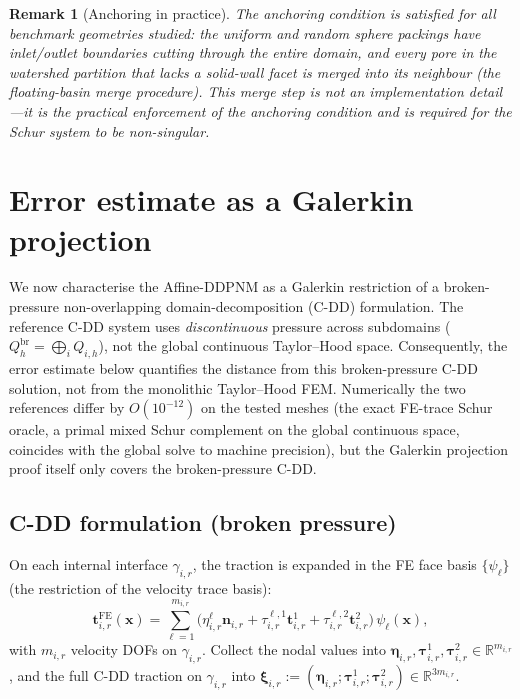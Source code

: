 \documentclass[11pt,a4paper]{article}
\newtheorem{remark}[lemma]{Remark}
\newcommand{\R}{\mathbb{R}}
\newcommand{\iface}{\gamma}
\newcommand{\normal}{\bm{n}}
\begin{document}
\begin{remark}[Anchoring in practice]
  The anchoring condition is satisfied for all benchmark geometries
  studied: the uniform and random sphere packings have inlet/outlet
  boundaries cutting through the entire domain, and every pore in the
  watershed partition that lacks a solid-wall facet is merged into its
  neighbour (the \emph{floating-basin merge} procedure).  This merge
  step is not an implementation detail---it is the practical enforcement
  of the anchoring condition and is required for the Schur system to be
  non-singular.
\end{remark}

\appendix
\section{Error estimate as a Galerkin projection}
\setcounter{lemma}{0}
\setcounter{theorem}{0}

We now characterise the Affine-DDPNM as a Galerkin restriction of a
broken-pressure non-overlapping domain-decomposition (C-DD) formulation.
The reference C-DD system uses \emph{discontinuous} pressure across
subdomains ($Q_h^{\text{br}} = \bigoplus_i Q_{i,h}$), not the global
continuous Taylor--Hood space.  Consequently, the error estimate below
quantifies the distance from this broken-pressure C-DD solution, not
from the monolithic Taylor--Hood FEM.  Numerically the two references
differ by $O(10^{-12})$ on the tested meshes (the exact FE-trace Schur
oracle, a primal mixed Schur complement on the global continuous space,
coincides with the global solve to machine precision), but the Galerkin
projection proof itself only covers the broken-pressure C-DD.

\subsection{C-DD formulation (broken pressure)}

On each internal interface $\iface_{i,r}$, the traction is expanded in the
FE face basis $\{\psi_\ell\}$ (the restriction of the velocity trace basis):
\[
  \bm{t}_{i,r}^{\text{FE}}(\bm{x})
  = \sum_{\ell=1}^{m_{i,r}}
    \bigl(\eta_{i,r}^\ell \normal_{i,r}
          + \tau_{i,r}^{\ell,1} \bm{t}_{i,r}^1
          + \tau_{i,r}^{\ell,2} \bm{t}_{i,r}^2\bigr)\,
    \psi_\ell(\bm{x}),
\]
with $m_{i,r}$ velocity DOFs on $\iface_{i,r}$.
Collect the nodal values into
$\bm{\eta}_{i,r},\bm{\tau}_{i,r}^1,\bm{\tau}_{i,r}^2 \in \R^{m_{i,r}}$,
and the full C-DD traction on $\iface_{i,r}$ into
$\bm{\xi}_{i,r} := (\bm{\eta}_{i,r}; \bm{\tau}_{i,r}^1; \bm{\tau}_{i,r}^2)
\in \R^{3m_{i,r}}$.
\end{document}
